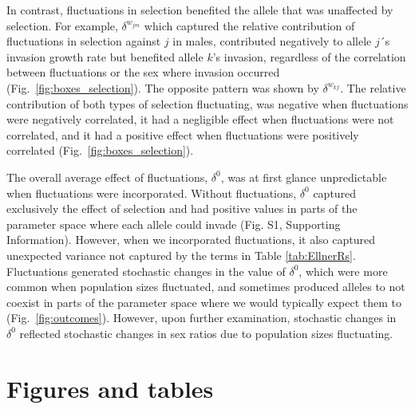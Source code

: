 \documentclass[12pt]{article}
\begin{document}
In contrast, fluctuations in selection benefited the allele that was unaffected by selection. For example, $\delta^{w_{jm}}$ which captured the relative contribution of fluctuations in selection against $j$ in males, contributed negatively to allele $j$´s invasion growth rate but benefited allele $k$'s invasion, regardless of the correlation between fluctuations or the sex where invasion occurred (Fig.~\ref{fig:boxes_selection}). The opposite pattern was shown by $\delta^{w_{kf}}$. The relative contribution of both types of selection fluctuating, was negative when fluctuations were negatively correlated, it had a negligible effect when fluctuations were not correlated, and it had a positive effect when fluctuations were positively correlated (Fig.~\ref{fig:boxes_selection}).


The overall average effect of fluctuations, $\delta^{0}$, was at first glance unpredictable when fluctuations were incorporated. Without fluctuations, $\delta^{0}$ captured exclusively the effect of selection and had positive values in parts of the parameter space where each allele could invade (Fig. S1, Supporting Information). However, when we incorporated fluctuations, it also captured unexpected variance not captured by the terms in Table \ref{tab:EllnerRs}. Fluctuations generated stochastic changes in the value of  $\delta^{0}$, which were more common when population sizes fluctuated, and sometimes produced alleles to not coexist in parts of the parameter space where we would typically expect them to (Fig.~\ref{fig:outcomes}). However, upon further examination, stochastic changes in $\delta^{0}$ reflected stochastic changes in sex ratios due to population sizes fluctuating.



\clearpage
\section*{Figures and tables }
\end{document}
